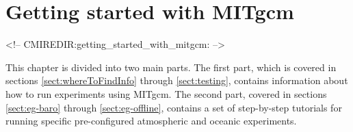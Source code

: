 
\chapter[Getting Started with MITgcm]{Getting started with MITgcm}
\label{chap:getting_started}

\begin{rawhtml}
<!-- CMIREDIR:getting_started_with_mitgcm: -->
\end{rawhtml}

This chapter is divided into two main parts. The first part, which is
covered in sections \ref{sect:whereToFindInfo} through
\ref{sect:testing}, contains information about how to run experiments
using MITgcm. The second part, covered in sections
\ref{sect:eg-baro} through \ref{sect:eg-offline}, contains a set of
step-by-step tutorials for running specific pre-configured atmospheric
and oceanic experiments.



\newpage


\newpage


\newpage


